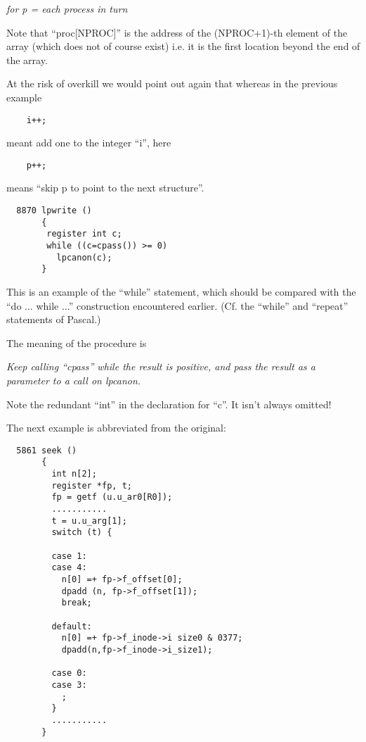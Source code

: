 {\it for p = each process in turn}

\medskip

\noindent Note that ``proc[NPROC]'' is the address
of the (NPROC+1)-th element of the
array (which does not of course exist)
i.e. it is the first location beyond
the end of the array.


At the risk of overkill we would point
out again that whereas in the previous
example

\begin{verbatim}
    i++;
\end{verbatim}

meant add one to the integer ``i'', here

\begin{verbatim}
    p++;
\end{verbatim}

means ``skip p to point to the next structure''.



\begin{verbatim}
  8870 lpwrite ()
       {
        register int c;
        while ((c=cpass()) >= 0)
          lpcanon(c);
       }
\end{verbatim}


This is an example of the ``while''
statement, which should be compared
with the ``do ... while ...'' construction encountered earlier. (Cf. the
``while'' and ``repeat'' statements of Pascal.)

\noindent The meaning of the procedure is

{\it Keep calling ``cpass'' while the
result is positive, and pass the
result as a parameter to a call on
lpcanon.} 

Note the redundant ``int'' in the
declaration for ``c''. It isn't always
omitted!



The next example is abbreviated from
the original:

\begin{verbatim}
  5861 seek ()
       {
         int n[2];
         register *fp, t;
         fp = getf (u.u_ar0[R0]);
         ...........
         t = u.u_arg[1];
         switch (t) {

         case 1:
         case 4:
           n[0] =+ fp->f_offset[0];
           dpadd (n, fp->f_offset[1]);
           break;

         default:
           n[0] =+ fp->f_inode->i size0 & 0377;
           dpadd(n,fp->f_inode->i_size1);

         case 0:
         case 3:
           ;
         }
         ...........
       }
\end{verbatim}

